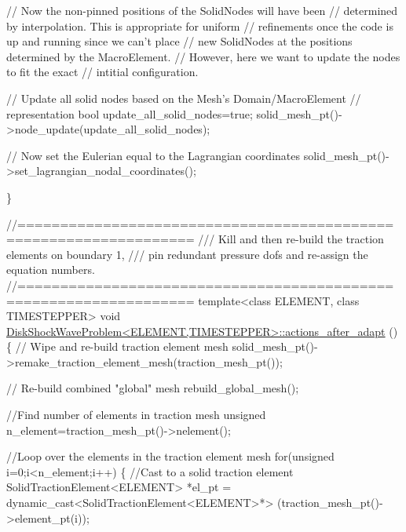 \begin{DoxyCodeInclude}
 \textcolor{comment}{// Now the non-pinned positions of the SolidNodes will have been}
 \textcolor{comment}{// determined by interpolation. This is appropriate for uniform}
 \textcolor{comment}{// refinements once the code is up and running since we can't place}
 \textcolor{comment}{// new SolidNodes at the positions determined by the MacroElement.}
 \textcolor{comment}{// However, here we want to update the nodes to fit the exact}
 \textcolor{comment}{// intitial configuration.}

 \textcolor{comment}{// Update all solid nodes based on the Mesh's Domain/MacroElement}
 \textcolor{comment}{// representation}
 \textcolor{keywordtype}{bool} update\_all\_solid\_nodes=\textcolor{keyword}{true};
 solid\_mesh\_pt()->node\_update(update\_all\_solid\_nodes);

 \textcolor{comment}{// Now set the Eulerian equal to the Lagrangian coordinates}
 solid\_mesh\_pt()->set\_lagrangian\_nodal\_coordinates();
 
\}






\textcolor{comment}{//==================================================================}\textcolor{comment}{}
\textcolor{comment}{/// Kill and then re-build the traction elements on boundary 1,}
\textcolor{comment}{/// pin redundant pressure dofs and re-assign the equation numbers.}
\textcolor{comment}{}\textcolor{comment}{//==================================================================}
\textcolor{keyword}{template}<\textcolor{keyword}{class} ELEMENT, \textcolor{keyword}{class} TIMESTEPPER>
\textcolor{keywordtype}{void} \hyperlink{classDiskShockWaveProblem_ac2a22a8399355e461d1a9ad1e5425c9a}{DiskShockWaveProblem<ELEMENT,TIMESTEPPER>::actions\_after\_adapt}
      ()
\{ 
 \textcolor{comment}{// Wipe and re-build traction element mesh}
 solid\_mesh\_pt()->remake\_traction\_element\_mesh(traction\_mesh\_pt());
 
 \textcolor{comment}{// Re-build combined "global" mesh}
 rebuild\_global\_mesh();

 \textcolor{comment}{//Find number of elements in traction mesh}
 \textcolor{keywordtype}{unsigned} n\_element=traction\_mesh\_pt()->nelement();
  
 \textcolor{comment}{//Loop over the elements in the traction element mesh}
 \textcolor{keywordflow}{for}(\textcolor{keywordtype}{unsigned} i=0;i<n\_element;i++)
  \{
   \textcolor{comment}{//Cast to a solid traction element}
   SolidTractionElement<ELEMENT> *el\_pt = 
    \textcolor{keyword}{dynamic\_cast<}SolidTractionElement<ELEMENT>*\textcolor{keyword}{>}
    (traction\_mesh\_pt()->element\_pt(i));


\end{DoxyCodeInclude}
